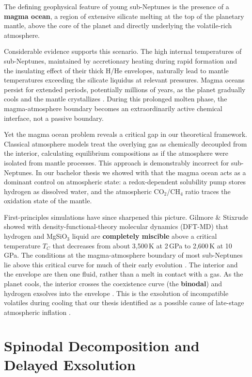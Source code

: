 The defining geophysical feature of young sub-Neptunes is the presence of a \textbf{magma
ocean}, a region of extensive silicate melting at the top of the planetary mantle, above the
core of the planet and directly underlying the volatile-rich atmosphere.

Considerable evidence supports this scenario. The high internal temperatures of
sub-Neptunes, maintained by accretionary heating during rapid formation and the insulating
effect of their thick H/He envelopes, naturally lead to mantle temperatures exceeding the
silicate liquidus at relevant pressures. Magma oceans persist for extended periods,
potentially millions of years, as the planet gradually cools and the mantle crystallizes
\cite{hamano2013}. During this prolonged molten phase, the magma-atmosphere boundary becomes
an extraordinarily active chemical interface, not a passive boundary.

Yet the magma ocean problem reveals a critical gap in our theoretical framework. Classical
atmosphere models treat the overlying gas as chemically decoupled from the interior,
calculating equilibrium compositions as if the atmosphere were isolated from mantle
processes. This approach is demonstrably incorrect for sub-Neptunes. In our bachelor thesis
\cite{laga2025} we showed with \Atm{} that the magma ocean acts as a dominant control on
atmospheric state: a redox-dependent solubility pump stores hydrogen as dissolved water, and
the atmospheric CO$_2$/CH$_4$ ratio traces the oxidation state of the mantle.

First-principles simulations have since sharpened this picture. Gilmore \& Stixrude
\cite{gilmore2026} showed with density-functional-theory molecular dynamics (DFT-MD) that
hydrogen and MgSiO$_3$ liquid are \textbf{completely miscible} above a critical temperature
$T_C$ that decreases from about 3,500\,K at 2\,GPa to 2,600\,K at 10\,GPa. The conditions
at the magma-atmosphere boundary of most sub-Neptunes lie above this critical curve for much
of their early evolution \cite{gilmore2026,young2025}. The interior and the envelope are then
one fluid, rather than a melt in contact with a gas. As the planet cools, the interior
crosses the coexistence curve (the \textbf{binodal}) and hydrogen exsolves into the envelope
\cite{rogers2025,rogers2026,tejada2026}. This is the exsolution of incompatible volatiles
during cooling that our thesis identified as a possible cause of late-stage atmospheric
inflation \cite{laga2025}.

\section{Spinodal Decomposition and Delayed Exsolution}\label{sec:spinodal_intro}

